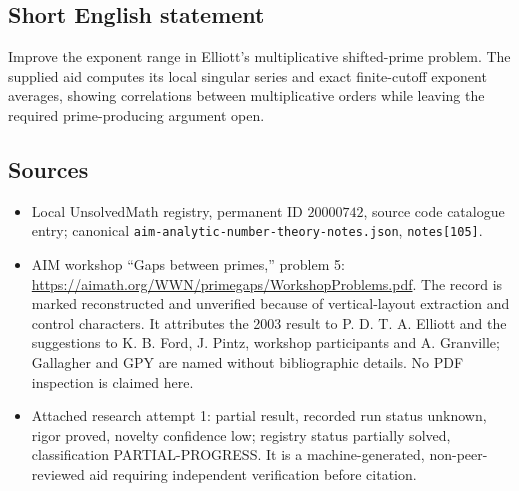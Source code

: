 \documentclass[11pt]{article}
\begin{document}
\subsection{Short English statement}
Improve the exponent range in Elliott's multiplicative shifted-prime problem. The supplied aid computes its local singular series and exact finite-cutoff exponent averages, showing correlations between multiplicative orders while leaving the required prime-producing argument open.
\subsection{Sources}
\begin{itemize}
\item Local UnsolvedMath registry, permanent ID $20000742$, source code catalogue entry; canonical \texttt{aim-analytic-number-theory-notes.json}, \texttt{notes[105]}.
\item AIM workshop ``Gaps between primes,'' problem 5: \url{https://aimath.org/WWN/primegaps/WorkshopProblems.pdf}. The record is marked reconstructed and unverified because of vertical-layout extraction and control characters. It attributes the 2003 result to P. D. T. A. Elliott and the suggestions to K. B. Ford, J. Pintz, workshop participants and A. Granville; Gallagher and GPY are named without bibliographic details. No PDF inspection is claimed here.
\item Attached research attempt 1: partial result, recorded run status unknown, rigor proved, novelty confidence low; registry status partially solved, classification PARTIAL-PROGRESS. It is a machine-generated, non-peer-reviewed aid requiring independent verification before citation.
\end{itemize}
\end{document}
